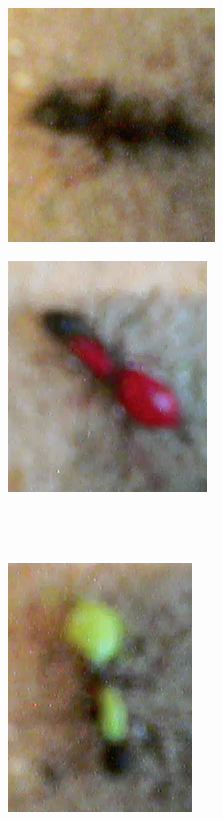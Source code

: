 \begin{figure}
        \centering
        \begin{subfigure}[b]{0.35\textwidth}
                \includegraphics[scale = 0.5]{img/natural_ant}
                \caption{}
        \end{subfigure}
		\quad
        \begin{subfigure}[b]{0.35\textwidth}
                \includegraphics[scale = 0.5]{img/red_ant}
                \caption{}
        \end{subfigure} \hfill \\ \mbox{}\\
        \begin{subfigure}[b]{0.35\textwidth}
                \includegraphics[scale = 0.5]{img/green_ant}

\end{subfigure}
\end{figure}
